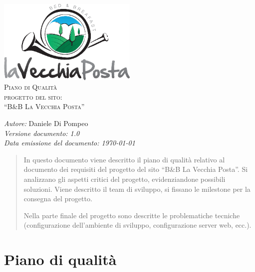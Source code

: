 \documentclass[a4paper,12pt,hidelinks]{report}
\begin{document}
  \begin{titlepage}
    \begin{center}
      \includegraphics[width=0.5\textwidth,keepaspectratio=true]{../img/logo}\\[1cm]    
      \textsc{\LARGE Piano di Qualità}\\[0.6cm]
      \textsc{\LARGE  progetto del sito:\\[0.5cm] ``B\&B La Vecchia Posta''}\\ [2.0cm]

      \begin{minipage}{0.8\textwidth}
	\begin{flushleft} \large
	  \emph{Autore:} Daniele Di Pompeo \\[0.5cm]
	  \emph{Versione documento: 1.0}\\[0.5cm]
	  \emph{Data emissione del documento: \today}\\[0.5cm]
	\end{flushleft}
      \end{minipage}
    \end{center}
  \end{titlepage}

\tableofcontents
 
\begin{abstract}
In questo documento viene descritto il piano di qualità relativo al documento dei requisiti del progetto del sito ``B\&B La Vecchia Posta''. Si analizzano gli aspetti 
critici del progetto, evidenziandone possibili soluzioni. Viene descritto il team di sviluppo, si fissano le milestone per la consegna del progetto.
\par Nella parte finale del progetto sono descritte le problematiche tecniche (configurazione dell'ambiente di sviluppo, configurazione server web, ecc.).
\end{abstract}

\chapter{Piano di qualità}
\end{document}
